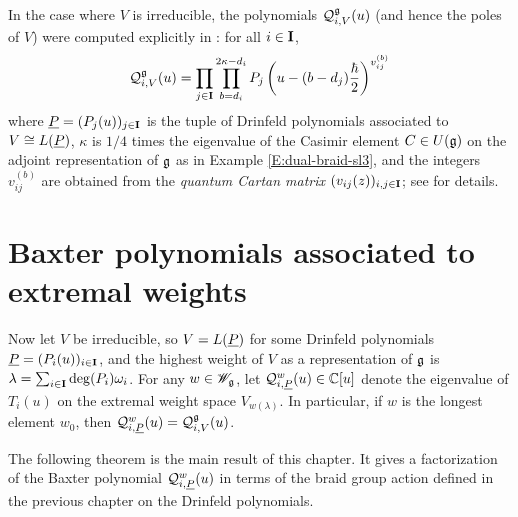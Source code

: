 In the case where $V$ is irreducible, the polynomials $\mathcal{Q}_{i,V}^{\mathfrak{g}}(u)$ (and hence the poles of $V$) were computed explicitly in \cite[Thm. 5.2]{gautam_poles_2023}: for all $i\in\mathbf{I}$,
\[\mathcal{Q}_{i,V}^{\mathfrak{g}}(u) = \prod_{j\in\mathbf{I}}\prod_{b=d_i}^{2\kappa-d_i} P_j\left(u-(b-d_j)\frac{\hbar}{2}\right)^{v_{ij}^{(b)}}\]
where $\underline{P}=(P_j(u))_{j\in\mathbf{I}}$ is the tuple of Drinfeld polynomials associated to $V\cong L(\underline{P})$, $\kappa$ is $1/4$ times the eigenvalue of the Casimir element $C\in U(\mathfrak{g})$ on the adjoint representation of $\mathfrak{g}$ as in Example \ref{E:dual-braid-sl3}, and the integers $v_{ij}^{(b)}$ are obtained from the \emph{quantum Cartan matrix} $(v_{ij}(z))_{i,j\in\mathbf{I}}$; see \cite[\S 5.2]{friesen_braid_2024} for details.


\section{Baxter polynomials associated to extremal weights}

Now let $V$ be irreducible, so $V=L(\underline{P})$ for some Drinfeld polynomials $\underline{P}=(P_i(u))_{i\in\mathbf{I}}$, and the highest weight of $V$ as a representation of $\mathfrak{g}$ is $\lambda = \sum_{i\in\mathbf{I}}\deg(P_i)\omega_i$.
For any $w\in\mathscr{W}_{\mathfrak{g}}$, let $\mathcal{Q}_{i,\underline{P}}^w(u)\in\mathbb{C}[u]$ denote the eigenvalue of $T_i(u)$ on the extremal weight space $V_{w(\lambda)}$.
In particular, if $w$ is the longest element $w_0$, then $\mathcal{Q}_{i,\underline{P}}^w(u) = \mathcal{Q}_{i,V}^{\mathfrak{g}}(u)$.

The following theorem is the main result of this chapter.
It gives a factorization of the Baxter polynomial $\mathcal{Q}_{i,\underline{P}}^w(u)$ in terms of the braid group action defined in the previous chapter on the Drinfeld polynomials.

